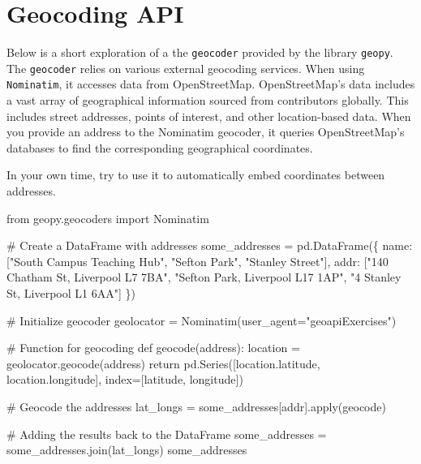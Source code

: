 \documentclass[
  letterpaper,
  DIV=11,
  numbers=noendperiod]{scrreprt}
\newenvironment{Shaded}{\begin{snugshade}}{\end{snugshade}}
\newcommand{\BuiltInTok}[1]{\textcolor[rgb]{0.00,0.23,0.31}{#1}}
\newcommand{\CommentTok}[1]{\textcolor[rgb]{0.37,0.37,0.37}{#1}}
\newcommand{\ControlFlowTok}[1]{\textcolor[rgb]{0.00,0.23,0.31}{#1}}
\newcommand{\ImportTok}[1]{\textcolor[rgb]{0.00,0.46,0.62}{#1}}
\newcommand{\KeywordTok}[1]{\textcolor[rgb]{0.00,0.23,0.31}{#1}}
\newcommand{\NormalTok}[1]{\textcolor[rgb]{0.00,0.23,0.31}{#1}}
\newcommand{\OperatorTok}[1]{\textcolor[rgb]{0.37,0.37,0.37}{#1}}
\newcommand{\StringTok}[1]{\textcolor[rgb]{0.13,0.47,0.30}{#1}}
\begin{document}
\section{Geocoding API}\label{geocoding-api}

Below is a short exploration of a the \texttt{geocoder} provided by the
library \texttt{geopy}. The \texttt{geocoder} relies on various external
geocoding services. When using \texttt{Nominatim}, it accesses data from
OpenStreetMap. OpenStreetMap's data includes a vast array of
geographical information sourced from contributors globally. This
includes street addresses, points of interest, and other location-based
data. When you provide an address to the Nominatim geocoder, it queries
OpenStreetMap's databases to find the corresponding geographical
coordinates.

In your own time, try to use it to automatically embed coordinates
between addresses.

\begin{Shaded}
\begin{Highlighting}[]
\ImportTok{from}\NormalTok{ geopy.geocoders }\ImportTok{import}\NormalTok{ Nominatim}

\CommentTok{\# Create a DataFrame with addresses}
\NormalTok{some\_addresses }\OperatorTok{=}\NormalTok{ pd.DataFrame(\{}
    \StringTok{\textquotesingle{}name\textquotesingle{}}\NormalTok{: [}\StringTok{"South Campus Teaching Hub"}\NormalTok{, }\StringTok{"Sefton Park"}\NormalTok{, }\StringTok{"Stanley Street"}\NormalTok{],}
    \StringTok{\textquotesingle{}addr\textquotesingle{}}\NormalTok{: [}\StringTok{"140 Chatham St, Liverpool L7 7BA"}\NormalTok{, }\StringTok{"Sefton Park, Liverpool L17 1AP"}\NormalTok{, }\StringTok{"4 Stanley St, Liverpool L1 6AA"}\NormalTok{]}
\NormalTok{\})}

\CommentTok{\# Initialize geocoder}
\NormalTok{geolocator }\OperatorTok{=}\NormalTok{ Nominatim(user\_agent}\OperatorTok{=}\StringTok{"geoapiExercises"}\NormalTok{)}

\CommentTok{\# Function for geocoding}
\KeywordTok{def}\NormalTok{ geocode(address):}
\NormalTok{    location }\OperatorTok{=}\NormalTok{ geolocator.geocode(address)}
    \ControlFlowTok{return}\NormalTok{ pd.Series([location.latitude, location.longitude], index}\OperatorTok{=}\NormalTok{[}\StringTok{\textquotesingle{}latitude\textquotesingle{}}\NormalTok{, }\StringTok{\textquotesingle{}longitude\textquotesingle{}}\NormalTok{])}

\CommentTok{\# Geocode the addresses}
\NormalTok{lat\_longs }\OperatorTok{=}\NormalTok{ some\_addresses[}\StringTok{\textquotesingle{}addr\textquotesingle{}}\NormalTok{].}\BuiltInTok{apply}\NormalTok{(geocode)}

\CommentTok{\# Adding the results back to the DataFrame}
\NormalTok{some\_addresses }\OperatorTok{=}\NormalTok{ some\_addresses.join(lat\_longs)}
\NormalTok{some\_addresses}
\end{Highlighting}
\end{Shaded}
\end{document}

